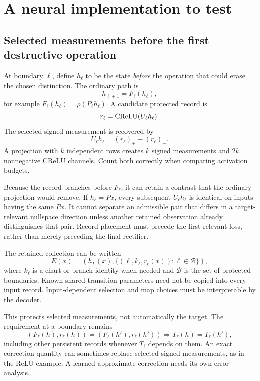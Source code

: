 \section{A neural implementation to test}
\label{sec:architecture}

\subsection{Selected measurements before the first destructive operation}

At boundary \(\ell\), define \(h_\ell\) to be the state \emph{before} the
operation that could erase the chosen distinction. The ordinary path is
\[
 h_{\ell+1}=F_\ell(h_\ell),
\]
for example \(F_\ell(h_\ell)=\rho(P_\ell h_\ell)\). A candidate protected
record is
\begin{equation}
 r_\ell=\operatorname{CReLU}(U_\ell h_\ell).
 \label{eq:selectivecrelu}
\end{equation}
The selected signed measurement is recovered by
\[
 U_\ell h_\ell=(r_\ell)_+-(r_\ell)_-.
\]
A projection with \(k\) independent rows creates \(k\) signed measurements
and \(2k\) nonnegative CReLU channels. Count both correctly when comparing
activation budgets.

Because the record branches before \(F_\ell\), it can retain a contrast that
the ordinary projection would remove. If \(h_\ell=Px\), every subsequent
\(U_\ell h_\ell\) is identical on inputs having the same \(Px\). It cannot
separate an admissible pair that differs in a target-relevant nullspace
direction unless another retained observation already distinguishes that pair.
Record placement must precede the first
relevant loss, rather than merely preceding the final rectifier.

The retained collection can be written
\[
 E(x)=\left(h_L(x),
 \{(\ell,k_\ell,r_\ell(x)):\ell\in\mathcal B\}\right),
\]
where \(k_\ell\) is a chart or branch identity when needed and
\(\mathcal B\) is the set of protected boundaries. Known shared transition
parameters need not be copied into every input record. Input-dependent
selection and map choices must be interpretable by the decoder.

This protects selected measurements, not automatically the target. The
requirement at a boundary remains
\[
 (F_\ell(h),r_\ell(h))=(F_\ell(h'),r_\ell(h'))
 \Longrightarrow T_\ell(h)=T_\ell(h'),
\]
including other persistent records whenever \(T_\ell\) depends on them.
An exact correction quantity can sometimes replace selected signed
measurements, as in the ReLU example. A learned approximate correction needs
its own error analysis.

